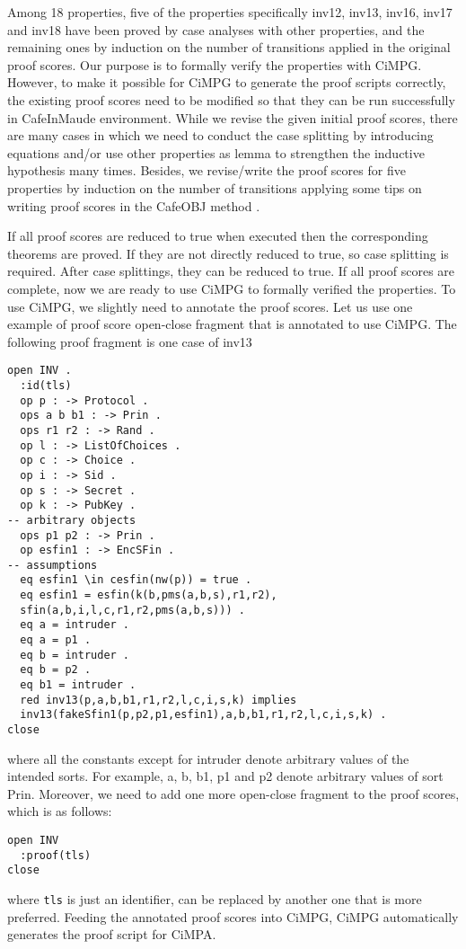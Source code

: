 \documentclass[a4paper,fleqn]{cas-dc}
\begin{document}
Among 18 properties, five of the properties specifically inv12, inv13, inv16, inv17 and inv18 have been proved by case analyses with other properties, and the remaining ones by induction on the number of transitions applied in the original proof scores. Our purpose is to formally verify the properties with CiMPG. However,  to  make  it  possible  for  CiMPG  to  generate  the proof scripts correctly, the existing proof scores need to be modified so that they can be run successfully in CafeInMaude environment. While we revise the given initial proof scores, there are many cases in which we need to conduct the case splitting by introducing equations and/or use other properties as lemma to strengthen the inductive hypothesis many times. Besides, we revise/write the proof scores for five properties by induction on the number of transitions applying some tips on writing proof scores in the CafeOBJ method \cite{Ogata2006}.

If all proof scores are reduced to true when executed then the corresponding theorems are proved. If they are not directly reduced to true, so case splitting is required. After case splittings, they can be reduced to true. If all proof scores are complete, now we are ready to use CiMPG to formally verified the properties. To use CiMPG, we slightly need to annotate the proof scores. Let us use one example of proof score open-close fragment that is annotated to use CiMPG. The following proof fragment is one case of inv13
\begin{small}
\begin{verbatim}
open INV .
  :id(tls)
  op p : -> Protocol .
  ops a b b1 : -> Prin .
  ops r1 r2 : -> Rand .
  op l : -> ListOfChoices .
  op c : -> Choice .
  op i : -> Sid .
  op s : -> Secret .
  op k : -> PubKey .
-- arbitrary objects
  ops p1 p2 : -> Prin .
  op esfin1 : -> EncSFin .
-- assumptions
  eq esfin1 \in cesfin(nw(p)) = true .
  eq esfin1 = esfin(k(b,pms(a,b,s),r1,r2),
  sfin(a,b,i,l,c,r1,r2,pms(a,b,s))) .
  eq a = intruder .
  eq a = p1 .
  eq b = intruder .
  eq b = p2 .
  eq b1 = intruder . 
  red inv13(p,a,b,b1,r1,r2,l,c,i,s,k) implies
  inv13(fakeSfin1(p,p2,p1,esfin1),a,b,b1,r1,r2,l,c,i,s,k) .
close
\end{verbatim}
\end{small}
where all the constants except for intruder denote arbitrary
values of the intended sorts. For example, a, b, b1, p1 and p2 denote arbitrary values of sort Prin. Moreover, we need to add one more open-close fragment to the proof scores, which is as follows:
\begin{small}
\begin{verbatim}
open INV
  :proof(tls)
close
\end{verbatim}
\end{small}
where \verb!tls! is just an identifier, can be replaced by another one that is more preferred. Feeding the annotated proof scores into CiMPG, CiMPG automatically generates the proof script for CiMPA.
\end{document}
